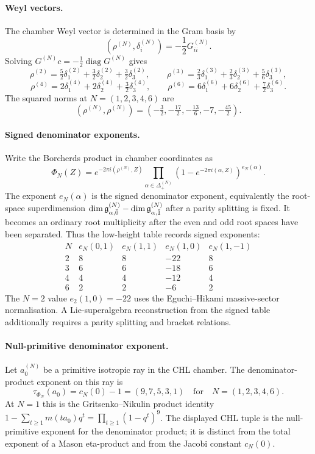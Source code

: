 \paragraph{Weyl vectors.}
The chamber Weyl vector is determined in the Gram basis by
\[
  (\rho^{(N)},\delta_i^{(N)})=-\frac12G^{(N)}_{ii}.
\]
Solving $G^{(N)}c=-\tfrac12\operatorname{diag}G^{(N)}$ gives
\[
  \rho^{(2)} =
  \tfrac52\delta_1^{(2)}+\tfrac32\delta_2^{(2)}
  +\tfrac32\delta_3^{(2)},
  \qquad
  \rho^{(3)} =
  \tfrac23\delta_1^{(3)}+\tfrac23\delta_2^{(3)}
  +\tfrac56\delta_3^{(3)},
\]
\[
  \rho^{(4)} =
  2\delta_1^{(4)}+2\delta_2^{(4)}+\tfrac32\delta_3^{(4)},
  \qquad
  \rho^{(6)} =
  6\delta_1^{(6)}+6\delta_2^{(6)}+\tfrac72\delta_3^{(6)}.
\]
The squared norms at $N=(1,2,3,4,6)$ are
\[
  (\rho^{(N)},\rho^{(N)})
  =
  \left(-\tfrac32,-\tfrac{17}{2},-\tfrac{13}{6},-7,-\tfrac{45}{2}\right).
\]

\paragraph{Signed denominator exponents.}
Write the Borcherds product in chamber coordinates as
\[
  \Phi_N(Z)=e^{-2\pi i(\rho^{(N)},Z)}
  \prod_{\alpha\in\Delta_+^{(N)}}
  \left(1-e^{-2\pi i(\alpha,Z)}\right)^{e_N(\alpha)}.
\]
The exponent $e_N(\alpha)$ is the signed denominator exponent, equivalently
the root-space superdimension
$\dim \mathfrak{g}^{(N)}_{\alpha,\bar0}-\dim \mathfrak{g}^{(N)}_{\alpha,\bar1}$ after a
parity splitting is fixed. It becomes an ordinary root multiplicity
after the even and odd root spaces have been separated. Thus the
low-height table records signed exponents:
\[
\begin{array}{c|cccc}
N & e_N(0,1) & e_N(1,1) & e_N(1,0) & e_N(1,-1) \\
\hline
2 & 8 & 8 & -22 & 8 \\
3 & 6 & 6 & -18 & 6 \\
4 & 4 & 4 & -12 & 4 \\
6 & 2 & 2 & -6 & 2
\end{array}
\]
The $N=2$ value $e_2(1,0)=-22$ uses the Eguchi--Hikami
massive-sector normalisation. A Lie-superalgebra reconstruction from the
signed table additionally requires a parity splitting and bracket
relations.

\paragraph{Null-primitive denominator exponent.}
Let $a_0^{(N)}$ be a primitive isotropic ray in the CHL chamber. The
denominator-product exponent on this ray is
\[
  \tau_{\Phi_N}(a_0)=c_N(0)-1=(9,7,5,3,1)
  \quad\text{for}\quad N=(1,2,3,4,6).
\]
At $N=1$ this is the Gritsenko--Nikulin product identity
$1-\sum_{t\geq1}m(ta_0)q^t=\prod_{t\geq1}(1-q^t)^9$. The displayed
CHL tuple is the null-primitive exponent for the denominator product;
it is distinct from the total exponent of a Mason eta-product and from
the Jacobi constant $c_N(0)$.

